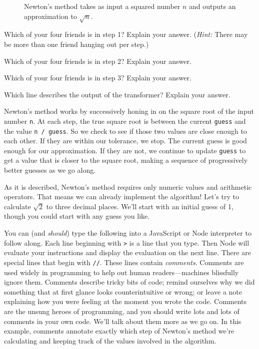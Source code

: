 \begin{figure*}
  
  \caption{\label{fig:intro-newton-fundamental-diagram} Newton's method takes as input a squared number $n$ and outputs an approximation to $\sqrt{n}$.}
\end{figure*}

\begin{question}
  Which of your four friends is in step 1? Explain your answer. (\textit{Hint:} There may be more than one friend hanging out per step.)
\end{question}

\begin{question}
  Which of your four friends is in step 2? Explain your answer.
\end{question}

\begin{question}
  Which of your four friends is in step 3? Explain your answer.
\end{question}

\begin{question}
  Which line describes the output of the transformer? Explain your answer.
\end{question}

Newton's method works by successively honing in on the square root of the input number \texttt{n}. At each step, the true square root is between the current \texttt{guess} and the value \texttt{n / guess}. So we check to see if those two values are close enough to each other. If they are within our tolerance, we stop. The current guess is good enough for our approximation. If they are not, we continue to update \texttt{guess} to get a value that is closer to the square root, making a sequence of progressively better guesses as we go along.

As it is described, Newton's method requires only numeric values and arithmetic operators. That means we can already implement the algorithm! Let's try to calculate $\sqrt{2}$ to three decimal places. We'll start with an initial guess of 1, though you could start with any guess you like.

You can (and \emph{should}) type the following into a JavaScript or Node interpreter to follow along. Each line beginning with \texttt{>} is a line that you type. Then Node will evaluate your instructions and display the evaluation on the next line. There are special lines that begin with \texttt{//}. These lines contain \emph{comments}. Comments are used widely in programming to help out human readers---machines blissfully ignore them. Comments describe tricky bits of code; remind ourselves why we did something that at first glance looks counterintuitive or wrong; or leave a note explaining how you were feeling at the moment you wrote the code. Comments are the unsung heroes of programming, and you should write lots and lots of comments in your own code. We'll talk about them more as we go on. In this example, comments annotate exactly which step of Newton's method we're calculating and keeping track of the values involved in the algorithm.


